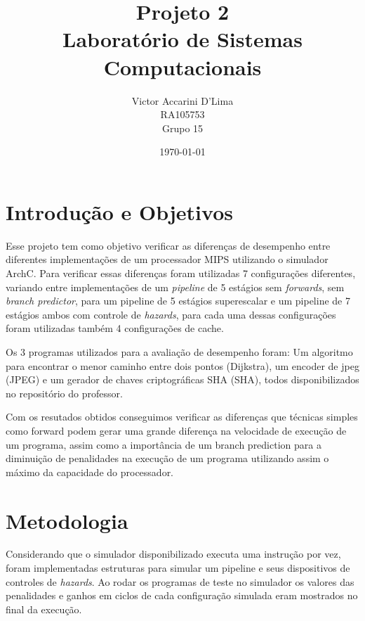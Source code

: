 \documentclass[pdftex,12pt,a4paper]{article}
\begin{document}
\title{Projeto 2\\Laboratório de Sistemas Computacionais}
\author{Victor Accarini D'Lima\\RA105753\\Grupo 15}
\date{\today}
\maketitle

\bigskip

\section{Introdução e Objetivos}

Esse projeto tem como objetivo verificar as diferenças de desempenho entre 
diferentes implementações de um processador MIPS utilizando o simulador ArchC. 
Para verificar essas diferenças foram utilizadas 7 configurações diferentes, 
variando entre implementações de um \textit{pipeline} de 5 estágios sem 
\textit{forwards}, sem \textit{branch predictor}, para um pipeline de 5 estágios 
superescalar e um pipeline de 7 estágios ambos com controle de \textit{hazards}, 
para cada uma dessas configurações foram utilizadas também 4 configurações de cache.

Os 3 programas utilizados para a avaliação de desempenho foram: Um algoritmo para 
encontrar o menor caminho entre dois pontos (Dijkstra), um encoder de jpeg (JPEG) e um 
gerador de chaves criptográficas SHA (SHA), todos disponibilizados no repositório do 
professor.

Com os resutados obtidos conseguimos verificar as diferenças que técnicas simples como
forward podem gerar uma grande diferença na velocidade de execução de um programa, 
assim como a importância de um branch prediction para a diminuição de penalidades 
na execução de um programa utilizando assim o máximo da capacidade do processador.

\section{Metodologia}

Considerando que o simulador disponibilizado executa uma instrução por vez, 
foram implementadas estruturas para simular um pipeline e seus dispositivos 
de controles de \textit{hazards}. Ao rodar os programas de teste no simulador 
os valores das penalidades e ganhos em ciclos de cada configuração simulada 
eram mostrados no final da execução.
\end{document}
